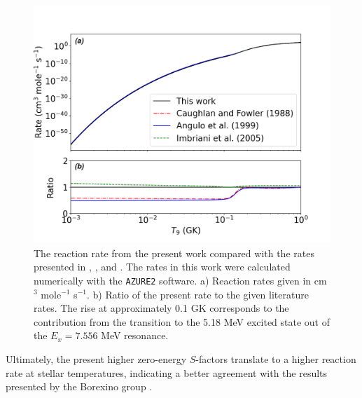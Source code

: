 \begin{figure}[htbp]
\centering
\includegraphics[width=1.0\columnwidth]{./figures/rr_with_518_zoom.png}
\caption{The reaction rate from the present work compared with the rates presented in \citet{Caughlan1988}, \citet{Angulo1999}, and \citet{Imbriani2005}. The rates in this work were calculated numerically with the \texttt{AZURE2} software. a) Reaction rates given in cm$^{3}$ mole$^{-1}$ s$^{-1}$. b) Ratio of the present rate to the given literature rates. The rise at approximately 0.1 GK corresponds to the contribution from the transition to the 5.18 MeV excited state out of the $E_{x}= 7.556$ MeV resonance. }
\label{fig: rrate_comp}
\end{figure}

Ultimately, the present higher zero-energy $S$-factors translate to a higher reaction rate at stellar temperatures, indicating a better agreement with the results presented by the Borexino group \cite{agostini2020direct}.


%
% 
% 

